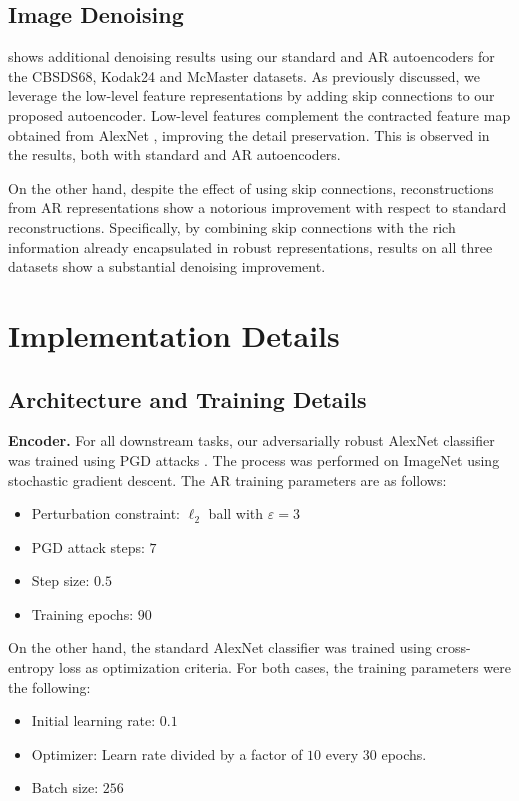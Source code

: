     
    \subsection{Image Denoising}
    \label{sec:supp_additional_denoising}
     shows additional denoising results using our standard and AR autoencoders for the CBSDS68, Kodak24 and McMaster datasets. As previously discussed, we leverage the low-level feature representations by adding skip connections to our proposed autoencoder. Low-level features complement the contracted feature map obtained from AlexNet , improving the detail preservation. This is observed in the results, both with standard and AR autoencoders.
    
    On the other hand, despite the effect of using skip connections, reconstructions from AR representations show a notorious improvement with respect to standard reconstructions. Specifically, by combining skip connections with the rich information already encapsulated in robust representations, results on all three datasets show a substantial denoising improvement.

\section{Implementation Details}\label{sec:supp_proposed_method}
    \subsection{Architecture and Training Details}
    \label{sec:supp_proposed}
    
    \textbf{Encoder.} For all downstream tasks, our adversarially robust AlexNet classifier was trained using PGD attacks \cite{madry_2018_towards}. The process was performed on ImageNet using stochastic gradient descent. The AR training parameters are as follows:
    \begin{itemize}
        \item Perturbation constraint: $\ell_{2}$ ball with $\varepsilon=3$
        \item PGD attack steps: $7$
        \item Step size: $0.5$
        \item Training epochs: $90$
    \end{itemize}
    
    On the other hand, the standard AlexNet classifier was trained using cross-entropy loss as optimization criteria. For both cases, the training parameters were the following:
    \begin{itemize}
        \item Initial learning rate: $0.1$
        \item Optimizer: Learn rate divided by a factor of $10$ every $30$ epochs.
        \item Batch size: $256$
    \end{itemize}

